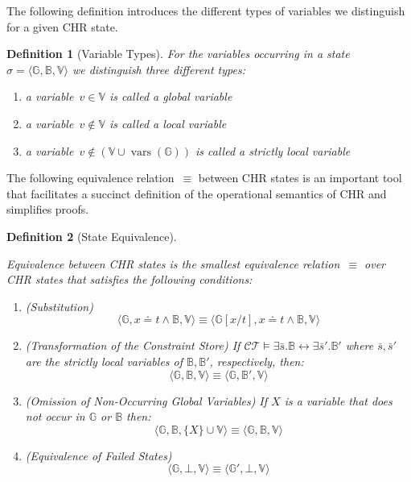 \documentclass{tlp}
\newtheorem{definition}{Definition}[section]
\newcommand{\st}[3]{\ensuremath{\langle #1 , #2 , #3 \rangle}}
\newcommand{\CT}{\ensuremath{\mathcal{CT}}}
\newcommand{\bbB}{\ensuremath{\mathbb{B}}}
\newcommand{\bbG}{\ensuremath{\mathbb{G}}}
\newcommand{\bbV}{\ensuremath{\mathbb{V}}}
\newcommand{\subxt}{\left[x/t\right] }
\DeclareMathOperator{\vars}{vars}
\begin{document}
The following definition introduces the different types of variables we
distinguish for a given CHR state.

\begin{definition}[Variable Types]\label{def:var_types} For the variables
occurring in a state~$\sigma = \st{\bbG}{\bbB}{\bbV}$ we distinguish three
different types:
\begin{enumerate}
  \item a variable~$v \in \bbV$ is called a \emph{global} variable
  \item a variable~$v \not \in \bbV$ is called a \emph{local} variable
  \item a variable~$v \not \in (\bbV \cup \vars(\bbG))$ is called a
  \emph{strictly local} variable
\end{enumerate}
\end{definition}

The following equivalence relation~$\equiv$ between CHR states \cite{Raiser2009a}
is an important tool that facilitates a succinct definition of the operational
semantics of CHR and simplifies proofs.

\begin{definition}[State Equivalence]
\label{def:equiv}

Equivalence between CHR states is the smallest equivalence relation~$\equiv$
over CHR states that satisfies the following conditions:

\begin{enumerate}
\item \label{cond:subst} \emph{(Substitution)}
\[
	\st{\bbG}{x \doteq t \land \bbB}{\bbV} \equiv
	\st{\bbG\subxt}{x \doteq t \land \bbB}{\bbV}
\]
\item \label{cond:ct} \emph{(Transformation of the Constraint Store)} If
$\CT\models\exists \bar s.\bbB \leftrightarrow\exists\bar s'.\bbB'$ where $\bar
s, \bar s'$ are the strictly local variables of $\bbB,\bbB'$, respectively,
then:
\[
	\st{\bbG}{\bbB}{\bbV} \equiv \st{\bbG}{\bbB'}{\bbV}
\]
\item \label{cond:global} \emph{(Omission of Non-Occurring Global Variables)} If
$X$ is a variable that does not occur in $\bbG$ or $\bbB$ then:
\[
	\st{\bbG}{\bbB}{\{X\}\cup\bbV} \equiv \st{\bbG}{\bbB}{\bbV}
\]
\item \label{cond:fail} \emph{(Equivalence of Failed States)}
\[
	\st{\bbG}{\bot}{\bbV} \equiv \st{\bbG'}{\bot}{\bbV}
\]
\end{enumerate}

\end{definition}
\end{document}
